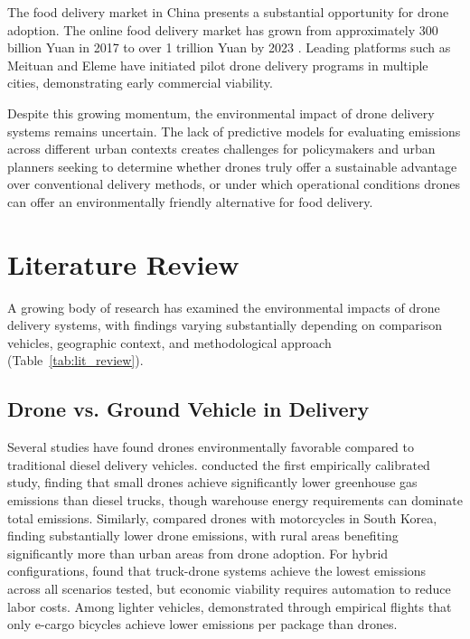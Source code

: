 \documentclass[11pt]{article}
\begin{document}

The food delivery market in China presents a substantial opportunity for drone adoption. The online food delivery market has grown from approximately 300 billion Yuan in 2017 to over 1 trillion Yuan by 2023 \parencite{statista2024chinafooddelivery}. Leading platforms such as Meituan and Eleme have initiated pilot drone delivery programs in multiple cities, demonstrating early commercial viability.

Despite this growing momentum, the environmental impact of drone delivery systems remains uncertain. The lack of predictive models for evaluating emissions across different urban contexts creates challenges for policymakers and urban planners seeking to determine whether drones truly offer a sustainable advantage over conventional delivery methods, or under which operational conditions drones can offer an environmentally friendly alternative for food delivery.

\section{Literature Review}

A growing body of research has examined the environmental impacts of drone delivery systems, with findings varying substantially depending on comparison vehicles, geographic context, and methodological approach (Table~\ref{tab:lit_review}).

\subsection{Drone vs. Ground Vehicle in Delivery}

Several studies have found drones environmentally favorable compared to traditional diesel delivery vehicles. \textcite{stolaroff_energy_2018} conducted the first empirically calibrated study, finding that small drones achieve significantly lower greenhouse gas emissions than diesel trucks, though warehouse energy requirements can dominate total emissions. Similarly, \textcite{park_comparative_2018} compared drones with motorcycles in South Korea, finding substantially lower drone emissions, with rural areas benefiting significantly more than urban areas from drone adoption. For hybrid configurations, \textcite{baldisseri_truck-based_2022} found that truck-drone systems achieve the lowest emissions across all scenarios tested, but economic viability requires automation to reduce labor costs. Among lighter vehicles, \textcite{rodrigues_drone_2022} demonstrated through empirical flights that only e-cargo bicycles achieve lower emissions per package than drones.
\end{document}
